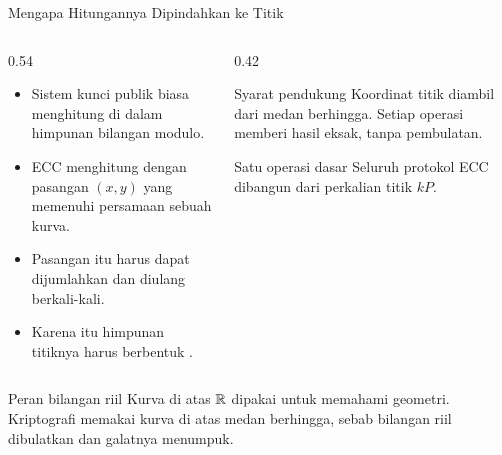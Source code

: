 \documentclass[aspectratio=169,11pt]{beamer}
\begin{document}
\begin{frame}{Mengapa Hitungannya Dipindahkan ke Titik}
    \begin{columns}[T,onlytextwidth]
        \begin{column}{0.54\textwidth}
            \footnotesize
            \begin{itemize}
                \item Sistem kunci publik biasa menghitung di dalam himpunan
                      bilangan modulo.
                \item ECC menghitung dengan pasangan $(x,y)$ yang memenuhi
                      persamaan sebuah kurva.
                \item Pasangan itu harus dapat dijumlahkan dan diulang
                      berkali-kali.
                \item Karena itu himpunan titiknya harus berbentuk
                      .
            \end{itemize}
        \end{column}
        \begin{column}{0.42\textwidth}
            \begin{block}{Syarat pendukung}
                \footnotesize
                Koordinat titik diambil dari medan berhingga. Setiap operasi
                memberi hasil eksak, tanpa pembulatan.
            \end{block}
            \begin{alertblock}{Satu operasi dasar}
                \footnotesize
                Seluruh protokol ECC dibangun dari perkalian titik $kP$.
            \end{alertblock}
        \end{column}
    \end{columns}
    \vspace{0.1cm}
    \begin{exampleblock}{Peran bilangan riil}
        \footnotesize
        Kurva di atas $\mathbb{R}$ dipakai untuk memahami geometri. Kriptografi
        memakai kurva di atas medan berhingga, sebab bilangan riil dibulatkan
        dan galatnya menumpuk.
    \end{exampleblock}
\end{frame}
\end{document}
